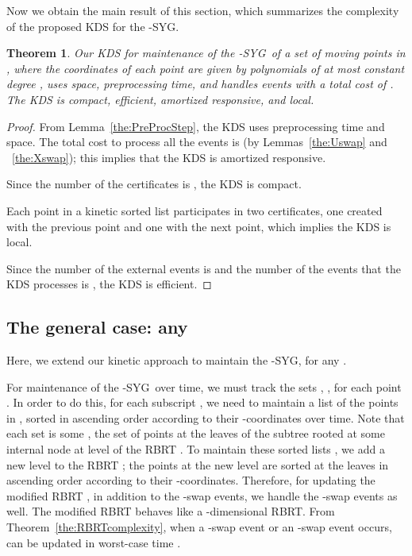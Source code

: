 \documentclass[preprint,12pt]{elsarticle}
\def\ksyg{\mbox{-SYG}}
\def\1syg{\mbox{-SYG}}
\newtheorem{theorem}{Theorem}[section]
\begin{document}
Now we obtain the main result of this section, which summarizes the complexity of the proposed KDS for the \1syg.

\begin{theorem}\label{the:KineticSYG}
Our KDS for maintenance of the \1syg~of a set of  moving points in , where the coordinates of each point are given by polynomials of at most constant degree , uses   space,  preprocessing time, and handles  events with a total cost of . The KDS is compact, efficient, amortized responsive, and local.
\end{theorem}
\begin{proof}
From Lemma~\ref{the:PreProcStep}, the KDS uses   preprocessing time and   space. The total cost to process all the  events is  (by Lemmas~\ref{the:Uswap} and ~\ref{the:Xswap}); this implies that the KDS is amortized responsive. 

Since the number of the certificates is , the KDS is compact. 

Each point in a kinetic sorted list participates in two certificates, one created with the previous point and one with the next point, which implies the KDS is local. 

Since the number of the external events is  and the number of the events that the KDS processes is , the KDS is efficient.
\end{proof}

\subsection{The general case: any }\label{sec:KDSforkSYG}
Here, we extend our kinetic approach to maintain the \ksyg, for any .

For maintenance of the \ksyg~over time, we must track the sets , , for each point . In order to do this, for each subscript , we need to maintain a list  of the points in , sorted in ascending order according to their -coordinates over time. Note that each set  is some , the set of points at the leaves of the subtree rooted at some internal node  at level  of the RBRT . To maintain these sorted lists , we add a new level to the RBRT ; the points at the new level are sorted at the leaves in ascending order according to their -coordinates. Therefore, for updating the modified RBRT , in addition to the -swap events, we handle the -swap events as well. The modified RBRT  behaves like a -dimensional RBRT. From Theorem~\ref{the:RBRTcomplexity}, when a -swap event or an -swap event occurs,  can be updated in worst-case time .
\end{document}
